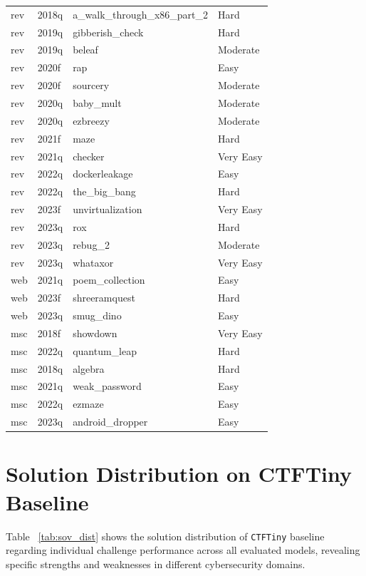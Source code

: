 \begin{table}[H]
\begin{tabular}{|l|l|p{3.5cm}|l|}
        rev & 2018q & a\_walk\_through\_x86\_part\_2 & Hard \\
        rev & 2019q & gibberish\_check & Hard \\
        rev & 2019q & beleaf & Moderate \\
        rev & 2020f & rap & Easy \\
        rev & 2020f & sourcery & Moderate \\
        rev & 2020q & baby\_mult & Moderate \\
        rev & 2020q & ezbreezy & Moderate \\
        rev & 2021f & maze & Hard \\
        rev & 2021q & checker & Very Easy \\
        rev & 2022q & dockerleakage & Easy \\
        rev & 2022q & the\_big\_bang & Hard \\
        rev & 2023f & unvirtualization & Very Easy \\
        rev & 2023q & rox & Hard \\
        rev & 2023q & rebug\_2 & Moderate \\
        rev & 2023q & whataxor & Very Easy \\
        web & 2021q & poem\_collection & Easy \\
        web & 2023f & shreeramquest & Hard \\
        web & 2023q & smug\_dino & Easy \\
        msc & 2018f & showdown & Very Easy \\
        msc & 2022q & quantum\_leap & Hard \\
        msc & 2018q & algebra & Hard \\
        msc & 2021q & weak\_password & Easy \\
        msc & 2022q & ezmaze & Easy \\
        msc & 2023q & android\_dropper & Easy \\
        \hline
    \end{tabular}
\end{table}

\section{Solution Distribution on CTFTiny Baseline}

Table ~\ref{tab:sov_dist} shows the solution distribution of \texttt{CTFTiny} baseline regarding individual challenge performance across all evaluated models, revealing specific strengths and weaknesses in different cybersecurity domains.

